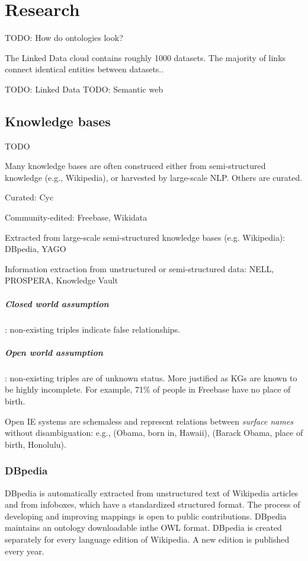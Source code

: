 \chapter{Research}

TODO: How do ontologies look?

The Linked Data cloud contains roughly 1000 datasets. The majority of links
connect identical entities between datasets.\cite{kg-refinement-survey}.

TODO: Linked Data
TODO: Semantic web

\section{Knowledge bases}

TODO

Many knowledge bases are often construced either from semi-structured knowledge
(e.g., Wikipedia), or harvested by large-scale NLP. Others are curated.

Curated: Cyc

Community-edited: Freebase, Wikidata

Extracted from large-scale semi-structured knowledge bases (e.g. Wikipedia):
DBpedia, YAGO

Information extraction from unstructured or semi-structured data: NELL,
PROSPERA, Knowledge Vault

\paragraph{Closed world assumption}: non-existing triples indicate false
relationships.

\paragraph{Open world assumption}: non-existing triples are of unknown status.
More justified as KGs are known to be highly incomplete. For example, 71\% of
people in Freebase have no place of birth.

Open IE systems are schemaless and represent relations between \textit{surface
names} without disambiguation: e.g., (Obama, born in, Hawaii), (Barack Obama,
place of birth, Honolulu).

\subsection{DBpedia}

DBpedia is automatically extracted from unstructured text of Wikipedia articles
and from infoboxes, which have a standardized structured format. The process of
developing and improving mappings is open to public contributions.
DBpedia maintains an ontology downloadable inthe OWL format.
DBpedia is created separately for every language edition of Wikipedia.
A new edition is published every year.

